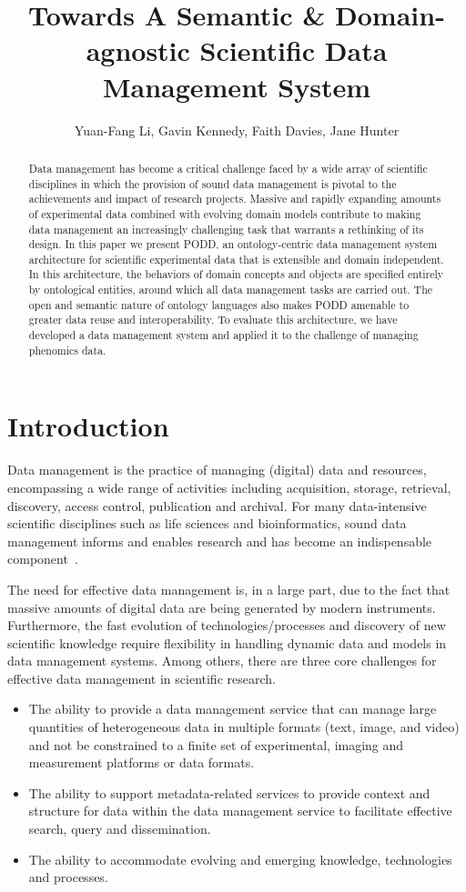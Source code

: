 \documentclass{llncs}
\title{Towards A Semantic \& Domain-agnostic Scientific Data Management System}
\author{Yuan-Fang Li, Gavin Kennedy, Faith Davies, Jane Hunter}
\institute{
School of ITEE\\
The University Of Queensland\\
Brisbane, Queensland 4072, Australia\\
\email{\texttt{\{}uqyli4,g.kennedy1,f.davies,j.hunter\texttt{\}}@uq.edu.au}
}
\begin{document}
\maketitle

\begin{abstract}
Data management has become a critical challenge faced by a wide array
of scientific disciplines in which the provision of sound data
management is pivotal to the achievements and impact of research
projects. Massive and rapidly expanding amounts of experimental data combined with
evolving domain models contribute to making data management
an increasingly challenging task that warrants a rethinking of its
design. In this paper we present PODD, an ontology-centric data management system architecture for scientific experimental data that is extensible and domain independent.
In this architecture, the behaviors of domain concepts and objects are
specified entirely by ontological entities, around which all data
management tasks are carried out. The open and semantic nature of ontology
languages also makes PODD amenable to greater data reuse and
interoperability. To evaluate this architecture, we have developed a data 
management system and applied it to the challenge of managing phenomics data.
\end{abstract}

\section{Introduction}\label{sec:intro}
Data management is the practice of managing (digital) data and
resources, encompassing a wide range of activities including
acquisition, storage, retrieval, discovery, access control,
publication and archival. For many
data-intensive scientific disciplines such as life sciences and
bioinformatics, sound data management informs and enables research and
has become an indispensable component~\cite{1107503}.

The need for effective data management is, in a large part, due to the
fact that massive amounts of digital data are being generated by modern
instruments. Furthermore, the fast evolution of technologies/processes
and discovery of new scientific knowledge require flexibility in
handling dynamic data and models in data management systems. Among
others, there are three core challenges for effective data management
in scientific research.

\begin{itemize}
\item The ability to provide a data management service that can manage
large quantities of heterogeneous data in multiple formats (text, image,
and video) and not be constrained to a finite set of experimental,
imaging and measurement platforms or data formats.

\item The ability to support metadata-related services to provide context
and structure for data within the data management service to facilitate
effective search, query and dissemination.

\item The ability to accommodate evolving and emerging knowledge,
technologies and processes.
\end{itemize}
\end{document}
